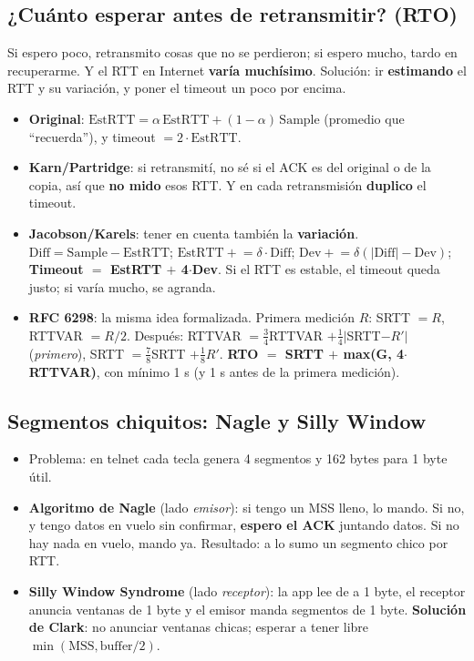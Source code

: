 \documentclass[10pt,a4paper]{article}
\newcommand{\term}[1]{\textbf{\color{azul}#1}}
\begin{document}
\subsection{¿Cuánto esperar antes de retransmitir? (RTO)}
\begin{idea}
Si espero poco, retransmito cosas que no se perdieron; si espero mucho, tardo en recuperarme. Y el RTT en Internet \textbf{varía muchísimo}.
Solución: ir \textbf{estimando} el RTT y su variación, y poner el timeout un poco por encima.
\end{idea}
\begin{itemize}
  \item \textbf{Original}: $\text{EstRTT} = \alpha\,\text{EstRTT} + (1-\alpha)\,\text{Sample}$ (promedio que ``recuerda''), y timeout $= 2\cdot\text{EstRTT}$.
  \item \term{Karn/Partridge}: si retransmití, no sé si el ACK es del original o de la copia, así que \textbf{no mido} esos RTT. Y en cada retransmisión \textbf{duplico} el timeout.
  \item \term{Jacobson/Karels}: tener en cuenta también la \textbf{variación}. $\text{Diff} = \text{Sample}-\text{EstRTT}$; $\text{EstRTT} \mathrel{+}= \delta\cdot\text{Diff}$; $\text{Dev} \mathrel{+}= \delta(|\text{Diff}|-\text{Dev})$;
        \textbf{Timeout $=$ EstRTT $+$ 4$\cdot$Dev}. Si el RTT es estable, el timeout queda justo; si varía mucho, se agranda.
  \item \textbf{RFC 6298}: la misma idea formalizada. Primera medición $R$: SRTT $=R$, RTTVAR $=R/2$. Después: RTTVAR $= \tfrac34$RTTVAR $+ \tfrac14|$SRTT$-R'|$ (\emph{primero}), SRTT $= \tfrac78$SRTT $+ \tfrac18 R'$.
        \textbf{RTO $=$ SRTT $+$ max(G, 4$\cdot$RTTVAR)}, con mínimo 1 s (y 1 s antes de la primera medición).
\end{itemize}

\subsection{Segmentos chiquitos: Nagle y Silly Window}
\begin{itemize}
  \item Problema: en telnet cada tecla genera 4 segmentos y 162 bytes para 1 byte útil.
  \item \term{Algoritmo de Nagle} (lado \emph{emisor}): si tengo un MSS lleno, lo mando. Si no, y tengo datos en vuelo sin confirmar, \textbf{espero el ACK} juntando datos. Si no hay nada en vuelo, mando ya.
        Resultado: a lo sumo un segmento chico por RTT.
  \item \term{Silly Window Syndrome} (lado \emph{receptor}): la app lee de a 1 byte, el receptor anuncia ventanas de 1 byte y el emisor manda segmentos de 1 byte.
        \textbf{Solución de Clark}: no anunciar ventanas chicas; esperar a tener libre $\min(\text{MSS}, \text{buffer}/2)$.
\end{itemize}
\end{document}
